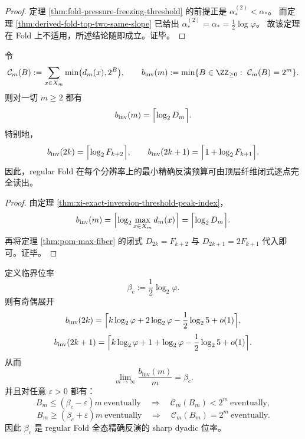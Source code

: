 \begin{proof}
定理 \ref{thm:fold-pressure-freezing-threshold} 的前提正是
\(
\alpha_\ast^{(2)}<\alpha_\ast
\)。
而定理 \ref{thm:derived-fold-top-two-same-slope} 已给出
\(
\alpha_\ast^{(2)}=\alpha_\ast=\frac12\log\varphi
\)。
故该定理在 Fold 上不适用，所述结论随即成立。证毕。
\end{proof}

\begin{theorem}\label{thm:derived-fold-exact-inversion-dyadic-threshold}
令
\[
\mathcal C_m(B):=\sum_{x\in X_m}\min\bigl(d_m(x),2^B\bigr),
\qquad
b_{\mathrm{inv}}(m):=\min\{B\in\ZZ_{\ge 0}:\ \mathcal C_m(B)=2^m\}.
\]
则对一切 \(m\ge 2\) 都有
\[
b_{\mathrm{inv}}(m)=\Bigl\lceil\log_2 D_m\Bigr\rceil.
\]
特别地，
\[
b_{\mathrm{inv}}(2k)=\Bigl\lceil \log_2 F_{k+2}\Bigr\rceil,
\qquad
b_{\mathrm{inv}}(2k+1)=\Bigl\lceil 1+\log_2 F_{k+1}\Bigr\rceil.
\]
因此，regular Fold 在每个分辨率上的最小精确反演预算可由顶层纤维闭式逐点完全读出。
\end{theorem}

\begin{proof}
由定理 \ref{thm:xi-exact-inversion-threshold-peak-index}，
\[
b_{\mathrm{inv}}(m)=\Bigl\lceil \log_2 \max_{x\in X_m}d_m(x)\Bigr\rceil
=
\Bigl\lceil \log_2 D_m\Bigr\rceil.
\]
再将定理 \ref{thm:pom-max-fiber} 的闭式
\(
D_{2k}=F_{k+2}
\)
与
\(
D_{2k+1}=2F_{k+1}
\)
代入即可。证毕。
\end{proof}

\begin{corollary}\label{cor:derived-fold-exact-inversion-parity-rate}
定义临界位率
\[
\beta_c:=\frac12\log_2\varphi.
\]
则有奇偶展开
\[
b_{\mathrm{inv}}(2k)
=
\Bigl\lceil
k\log_2\varphi
+2\log_2\varphi
-\frac12\log_2 5
+o(1)
\Bigr\rceil,
\]
\[
b_{\mathrm{inv}}(2k+1)
=
\Bigl\lceil
k\log_2\varphi
+1+\log_2\varphi
-\frac12\log_2 5
+o(1)
\Bigr\rceil.
\]
从而
\[
\lim_{m\to\infty}\frac{b_{\mathrm{inv}}(m)}{m}=\beta_c.
\]
并且对任意 \(\varepsilon>0\) 都有：
\[
B_m\le (\beta_c-\varepsilon)m\ \text{eventually}
\quad\Longrightarrow\quad
\mathcal C_m(B_m)<2^m\ \text{eventually},
\]
\[
B_m\ge (\beta_c+\varepsilon)m\ \text{eventually}
\quad\Longrightarrow\quad
\mathcal C_m(B_m)=2^m\ \text{eventually}.
\]
因此 \(\beta_c\) 是 regular Fold 全态精确反演的 sharp dyadic 位率。
\end{corollary}

